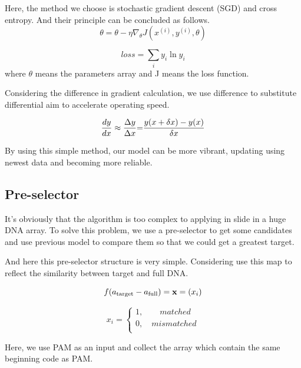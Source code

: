 Here, the method we choose is stochastic gradient descent (SGD) and cross entropy. And their principle can be concluded as follows.
\begin{equation}
\theta  = \theta  - \eta {\nabla _\theta }J({x^{(i)}},{y^{(i)}},\theta )
\end{equation}
	
\begin{equation}
loss = \sum\limits_i {{y_i}\ln {y_i}}
\end{equation}
where $\theta$ means the parameters array and J means the loss function. 

Considering the difference in gradient calculation, we use difference to substitute differential aim to accelerate operating speed.\par
\begin{equation}
\frac{{dy}}{{dx}} \approx \frac{{\Delta y}}{{\Delta x}}{\rm{ = }}\frac{{y(x + \delta x) - y(x)}}{{\delta x}}
\end{equation}

By using this simple method, our model can be more vibrant, updating using newest data and becoming more reliable.

\subsection{Pre-selector}
It’s obviously that the algorithm is too complex to applying in slide in a huge DNA array. To solve this problem, we use a pre-selector to get some candidates and use previous model to compare them so that we could get a greatest target.\par
And here this pre-selector structure is very simple.
Considering use this map to reflect the similarity between target and full DNA.

\begin{equation}
f({a_{{\rm{target}}}} - {a_{{\rm{full}}}}) = {\bf{x}} = ({x_i})
\end{equation}

\begin{equation}{x_i} = \left\{ {\begin{array}{*{20}{c}}
{1,\quad \quad matched}  \\
{0,\quad mismatched}  \\
\end{array}} \right.
\end{equation}

Here, we use PAM as an input and collect the array which contain the same beginning code as PAM.

